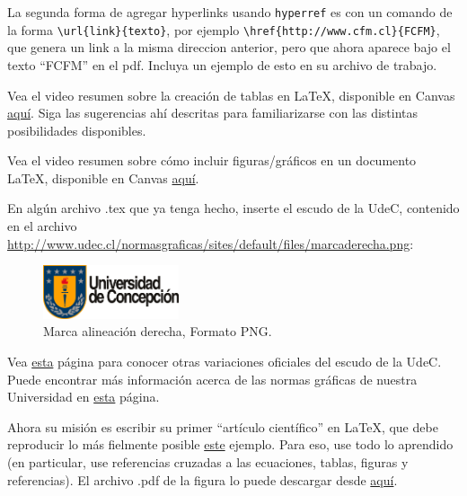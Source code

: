\documentclass[11pt]{exam}
\begin{document}
\begin{questions}
\item La segunda forma de agregar hyperlinks usando \texttt{hyperref} es con un comando de la forma \verb|\url{link}{texto}|, por ejemplo \verb|\href{http://www.cfm.cl}{FCFM}|, que genera un link a la misma direccion anterior, pero que ahora aparece bajo el texto ``FCFM'' en el pdf. Incluya un ejemplo de esto en su archivo de trabajo.

\item Vea el video resumen sobre la creación de tablas en \LaTeX, disponible en Canvas \href{https://udec.instructure.com/courses/40179/pages/tablas?module_item_id=1465510}{aquí}. Siga las sugerencias ahí descritas para familiarizarse con las distintas posibilidades disponibles.

\item Vea el video resumen sobre cómo incluir figuras/gráficos en un documento \LaTeX, disponible en Canvas \href{https://udec.instructure.com/courses/40179/pages/figuras?module_item_id=1465511}{aquí}.
\item En algún archivo .tex que ya tenga hecho, inserte el escudo de la UdeC, contenido en el archivo \url{http://www.udec.cl/normasgraficas/sites/default/files/marcaderecha.png}:
\begin{figure}[h!]
\begin{center}
\includegraphics[width=4cm]{marcaderecha.png}
\end{center}
\caption{Marca alineación derecha, Formato PNG.}
\label{fig:escudo}
\end{figure}

Vea \href{http://www.udec.cl/normasgraficas/node/7}{esta} página para conocer otras variaciones oficiales del escudo de la UdeC. 
Puede encontrar más información acerca de las normas gráficas de nuestra Universidad en \href{http://www.udec.cl/normasgraficas}{esta} página.

\item Ahora su misión es escribir su primer ``artículo científico'' en \LaTeX, que debe reproducir lo más fielmente posible \href{https://github.com/gfrubi/CC/blob/master/guias/06/ejemplo-articulo.pdf}{este} ejemplo. Para eso, use todo lo aprendido (en particular, use referencias cruzadas a las ecuaciones, tablas, figuras y referencias). El archivo .pdf de la figura lo puede descargar desde \href{https://github.com/gfrubi/CC/blob/master/guias/06/fig-ajuste-lineal.pdf}{aquí}.


\end{questions}
\end{document}
